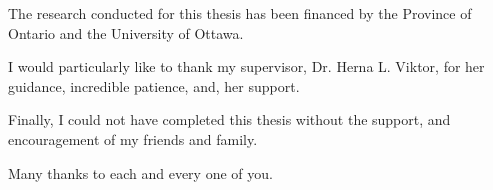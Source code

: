 \documentclass[
12pt, %
oneside, %
english, %
draft=false,
doublespacing, %
liststotoc, %
toctotoc, %
parskip, %
headsepline, %
]{MastersDoctoralThesis} %
\begin{document}

\begin{acknowledgements}
\addchaptertocentry{\acknowledgementname} %
The research conducted for this thesis has been financed by the Province of Ontario and the University of Ottawa.

I would particularly like to thank my supervisor, Dr. Herna L. Viktor, for her guidance, incredible patience, and, her support.

Finally, I could not have completed this thesis without the support, and encouragement of my friends and family.

Many thanks to each and every one of you.
\end{acknowledgements}


\tableofcontents %

\listoffigures %

\listoftables %

\listofalgorithms
{}

\end{document}
